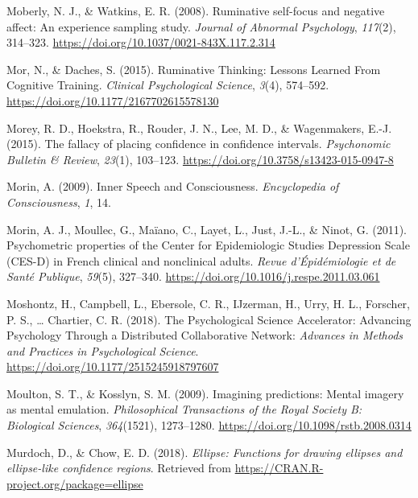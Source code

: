 \documentclass[a4paper,12pt,twoside,onecolumn,openright,final,oldfontcommands]{memoir}
\begin{document}
\leavevmode\hypertarget{ref-Moberly2008}{}%
Moberly, N. J., \& Watkins, E. R. (2008). Ruminative self-focus and negative affect: An experience sampling study. \emph{Journal of Abnormal Psychology}, \emph{117}(2), 314--323. \url{https://doi.org/10.1037/0021-843X.117.2.314}

\leavevmode\hypertarget{ref-mor_ruminative_2015}{}%
Mor, N., \& Daches, S. (2015). Ruminative Thinking: Lessons Learned From Cognitive Training. \emph{Clinical Psychological Science}, \emph{3}(4), 574--592. \url{https://doi.org/10.1177/2167702615578130}

\leavevmode\hypertarget{ref-morey_fallacy_2015}{}%
Morey, R. D., Hoekstra, R., Rouder, J. N., Lee, M. D., \& Wagenmakers, E.-J. (2015). The fallacy of placing confidence in confidence intervals. \emph{Psychonomic Bulletin \& Review}, \emph{23}(1), 103--123. \url{https://doi.org/10.3758/s13423-015-0947-8}

\leavevmode\hypertarget{ref-morin_inner_2009}{}%
Morin, A. (2009). Inner Speech and Consciousness. \emph{Encyclopedia of Consciousness}, \emph{1}, 14.

\leavevmode\hypertarget{ref-morin_psychometric_2011}{}%
Morin, A. J., Moullec, G., Maïano, C., Layet, L., Just, J.-L., \& Ninot, G. (2011). Psychometric properties of the Center for Epidemiologic Studies Depression Scale (CES-D) in French clinical and nonclinical adults. \emph{Revue d'Épidémiologie et de Santé Publique}, \emph{59}(5), 327--340. \url{https://doi.org/10.1016/j.respe.2011.03.061}

\leavevmode\hypertarget{ref-moshontz_psychological_2018}{}%
Moshontz, H., Campbell, L., Ebersole, C. R., IJzerman, H., Urry, H. L., Forscher, P. S., \ldots{} Chartier, C. R. (2018). The Psychological Science Accelerator: Advancing Psychology Through a Distributed Collaborative Network: \emph{Advances in Methods and Practices in Psychological Science}. \url{https://doi.org/10.1177/2515245918797607}

\leavevmode\hypertarget{ref-moulton_imagining_2009}{}%
Moulton, S. T., \& Kosslyn, S. M. (2009). Imagining predictions: Mental imagery as mental emulation. \emph{Philosophical Transactions of the Royal Society B: Biological Sciences}, \emph{364}(1521), 1273--1280. \url{https://doi.org/10.1098/rstb.2008.0314}

\leavevmode\hypertarget{ref-R-ellipse}{}%
Murdoch, D., \& Chow, E. D. (2018). \emph{Ellipse: Functions for drawing ellipses and ellipse-like confidence regions}. Retrieved from \url{https://CRAN.R-project.org/package=ellipse}
\end{document}

